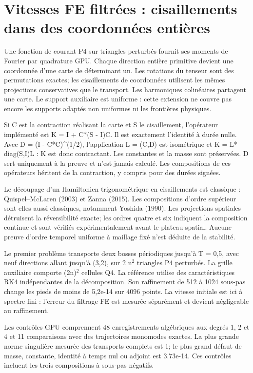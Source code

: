 \documentclass[10pt,a4paper]{article}
\begin{document}
\section{Vitesses FE filtrées : cisaillements dans des coordonnées entières}
Une fonction de courant P4 sur triangles perturbés fournit ses moments de Fourier par quadrature GPU. Chaque direction entière primitive devient une coordonnée d’une carte de déterminant un. Les rotations du tenseur sont des permutations exactes; les cisaillements de coordonnées utilisent les mêmes projections conservatives que le transport. Les harmoniques colinéaires partagent une carte. Le support auxiliaire est uniforme : cette extension ne couvre pas encore les supports adaptés non uniformes ni les frontières physiques.

Si C est la contraction réalisant la carte et S le cisaillement, l’opérateur implémenté est K = I + C*(S - I)C. Il est exactement l’identité à durée nulle. Avec D = (I - C*C)\textasciicircum{}(1/2), l’application L = (C,D) est isométrique et K = L* diag(S,I)L : K est donc contractant. Les constantes et la masse sont préservées. D sert uniquement à la preuve et n’est jamais calculé. Les compositions de ces opérateurs héritent de la contraction, y compris pour des durées signées.

Le découpage d’un Hamiltonien trigonométrique en cisaillements est classique : Quispel–McLaren (2003) et Zanna (2015). Les compositions d’ordre supérieur sont elles aussi classiques, notamment Yoshida (1990). Les projections spatiales détruisent la réversibilité exacte; les ordres quatre et six indiquent la composition continue et sont vérifiés expérimentalement avant le plateau spatial. Aucune preuve d’ordre temporel uniforme à maillage fixé n’est déduite de la stabilité.

Le premier problème transporte deux bosses périodiques jusqu’à T = 0,5, avec neuf directions allant jusqu’à (3,2), sur 2 n\(^{2}\) triangles P4 perturbés. La grille auxiliaire comporte (2n)\(^{2}\) cellules Q4. La référence utilise des caractéristiques RK4 indépendantes de la décomposition. Son raffinement de 512 à 1024 sous-pas change les pieds de moins de 5,2e-14 sur 4096 points. La vitesse initiale est ici à spectre fini : l’erreur du filtrage FE est mesurée séparément et devient négligeable au raffinement.

Les contrôles GPU comprennent 48 enregistrements algébriques aux degrés 1, 2 et 4 et 11 comparaisons avec des trajectoires monomodes exactes. La plus grande norme singulière mesurée des transports complets est 1; le plus grand défaut de masse, constante, identité à temps nul ou adjoint est 3.73e-14. Ces contrôles incluent les trois compositions à sous-pas négatifs.
\end{document}
